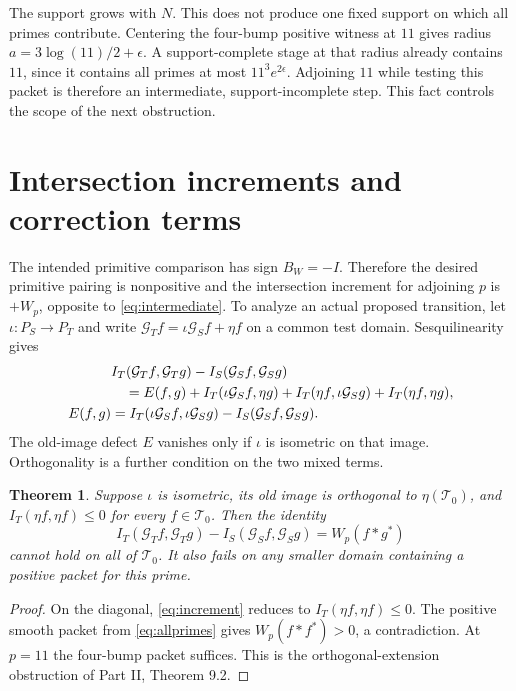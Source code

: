 \documentclass[11pt,letterpaper]{article}
\newtheorem{theorem}{Theorem}[section]
\theoremstyle{definition}
\theoremstyle{remark}
\newcommand{\T}{\mathcal T}
\begin{document}
The support grows with $N$. This does not produce one fixed
support on which all primes contribute. Centering the four-bump
positive witness at $11$ gives radius
$a=3\log(11)/2+\epsilon$. A support-complete stage at that
radius already contains $11$, since it contains all primes
at most $11^3e^{2\epsilon}$. Adjoining $11$ while testing this
packet is therefore an intermediate, support-incomplete step.
This fact controls the scope of the next obstruction.

\section{Intersection increments and correction terms}

The intended primitive comparison has sign $B_W=-I$.
Therefore the desired primitive pairing is nonpositive and the
intersection increment for adjoining $p$ is $+W_p$, opposite to
\eqref{eq:intermediate}. To analyze an actual proposed transition,
let $\iota:P_S\to P_T$ and write
$\mathcal G_Tf=\iota\mathcal G_Sf+\eta f$ on a common test domain.
Sesquilinearity gives
\begin{align}
 &I_T(\mathcal G_Tf,\mathcal G_Tg)-I_S(\mathcal G_Sf,\mathcal G_Sg)\notag\\
 &\quad=E(f,g)+I_T(\iota\mathcal G_Sf,\eta g)
       +I_T(\eta f,\iota\mathcal G_Sg)+I_T(\eta f,\eta g),
 \label{eq:increment}\\
 E(f,g)&=I_T(\iota\mathcal G_Sf,\iota\mathcal G_Sg)
                       -I_S(\mathcal G_Sf,\mathcal G_Sg).
 \label{eq:E}
\end{align}
The old-image defect $E$ vanishes only if $\iota$ is isometric
on that image. Orthogonality is a further condition on the two
mixed terms.

\begin{theorem}\label{thm:orthogonal}
Suppose $\iota$ is isometric, its old image is orthogonal to
$\eta(\T_0)$, and $I_T(\eta f,\eta f)\le0$ for every
$f\in\T_0$. Then the identity
\begin{equation}
 I_T(\mathcal G_Tf,\mathcal G_Tg)-I_S(\mathcal G_Sf,\mathcal G_Sg)
                    =W_p(f*g^*)
 \label{eq:one-prime-target}
\end{equation}
cannot hold on all of $\T_0$. It also fails on any smaller
domain containing a positive packet for this prime.
\end{theorem}
\begin{proof}
On the diagonal, \eqref{eq:increment} reduces to
$I_T(\eta f,\eta f)\le0$. The positive smooth packet from
\eqref{eq:allprimes} gives $W_p(f*f^*)>0$, a contradiction.
At $p=11$ the four-bump packet suffices. This is the
orthogonal-extension obstruction of Part II, Theorem 9.2.
\end{proof}
\end{document}
